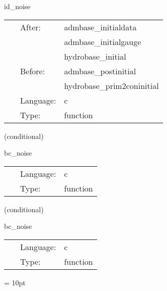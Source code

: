 \documentclass{article}
\begin{document}
\hspace{5mm} id\_noise 

\hspace{5mm}{\it add noise to initial data } 


\hspace{5mm}

 \begin{tabular*}{160mm}{cll} 
~ & After:  & admbase\_initialdata \\ 
~& ~ &admbase\_initialgauge\\ 
~& ~ &hydrobase\_initial\\ 
~ & Before:  & admbase\_postinitial \\ 
~& ~ &hydrobase\_prim2coninitial\\ 
~ & Language:  & c \\ 
~ & Type:  & function \\ 
\end{tabular*} 


\vspace{5mm}

   (conditional) 

\hspace{5mm} bc\_noise 

\hspace{5mm}{\it add noise to boundary condition } 


\hspace{5mm}

 \begin{tabular*}{160mm}{cll} 
~ & Language:  & c \\ 
~ & Type:  & function \\ 
\end{tabular*} 


\vspace{5mm}

   (conditional) 

\hspace{5mm} bc\_noise 

\hspace{5mm}{\it add noise to boundary condition } 


\hspace{5mm}

 \begin{tabular*}{160mm}{cll} 
~ & Language:  & c \\ 
~ & Type:  & function \\ 
\end{tabular*} 



\vspace{5mm}\parskip = 10pt 
\end{document}
